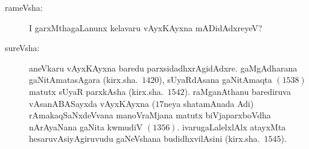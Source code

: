 \begin{description}
\item[rameVsha:] I garxMthagaLanunx kelavaru vAyxKAyxna mADidAdxreyeV?

\item[sureVsha:] aneVkaru vAyxKAyxna baredu parxsidadhxrAgidAdxre. gaMgAdharana gaNitAmatasAgara (kirx.sha.\ $1420$), sUyaRdAsana gaNitAmaqta $(1538)$ matutx sUyaR parxkAsha (kirx.sha.\ $1542$). raMganAthanu barediruva vAsanABASayxda vAyxKAyxna ($17$neya shatamAnada Adi) rAmakaqSaNxdeVvana manoVraMjana matutx biVjaparxboVdha nArAyaNana gaNita kwmudiV $(1356)$. ivarugaLalelxlAlx atayxMta hesaruvAsiyAgiruvudu gaNeVshana budidhxvilAsini (kirx.sha.\ $1545$).
\end{description}

